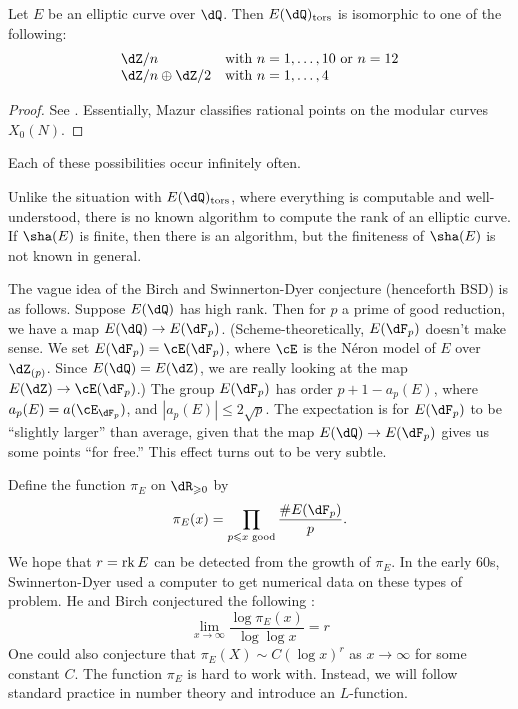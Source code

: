 \documentclass{article}
\begin{document}
\begin{theorem}
Let $E$ be an elliptic curve over $\dQ$. Then $E(\dQ)_\textnormal{tors}$ is 
isomorphic to one of the following:
\[
  \begin{array}{ll}
    \dZ/n & \text{with $n=1,\dots,10$ or $n=12$} \\
    \dZ/n\oplus \dZ/2 & \text{with $n=1,\dots,4$}
  \end{array}
\]
\end{theorem}
\begin{proof}
See \cite[III.5.1]{ma77}. Essentially, Mazur classifies rational points on the 
modular curves $X_0(N)$. 
\end{proof}

Each of these possibilities occur infinitely often.

Unlike the situation with $E(\dQ)_\text{tors}$, where everything is computable 
and well-understood, there is no known algorithm to compute the rank of an 
elliptic curve. If $\sha(E)$ is finite, then there is an algorithm, but the 
finiteness of $\sha(E)$ is not known in general. 

The vague idea of the Birch and Swinnerton-Dyer conjecture (henceforth BSD) is 
as follows. Suppose $E(\dQ)$ has high rank. Then for $p$ a prime of good 
reduction, we have a map $E(\dQ) \to E(\dF_p)$. (Scheme-theoretically, 
$E(\dF_p)$ doesn't make sense. We set $E(\dF_p) = \cE(\dF_p)$, where 
$\cE$ is the N\'eron model of $E$ over $\dZ_{(p)}$. Since 
$E(\dQ) = E(\dZ)$, we are really looking at the map 
$E(\dZ) \to \cE(\dF_p)$.) The group $E(\dF_p)$ has order 
$p+1-a_p(E)$, where $a_p(E) = a(\cE_{\dF_p})$, and 
$|a_p(E)|\leqslant 2\sqrt p$. The expectation is for $E(\dF_p)$ to be 
``slightly larger'' than average, given that the map 
$E(\dQ) \to E(\dF_p)$ gives us some points ``for free.'' This effect turns out 
to be very subtle. 

Define the function $\pi_E$ on $\dR_{\geqslant 0}$ by 
\[
  \pi_E(x) = \prod_{p\leqslant x \text{ good}} \frac{\# E(\dF_p)}{p} \text{.}
\]
We hope that $r=\operatorname{rk} E$ can be detected from the growth of $\pi_E$. In the 
early 60s, Swinnerton-Dyer used a computer to get numerical data on these 
types of problem. He and Birch conjectured the following \cite[A]{bsd65}: 
\[
  \lim_{x\to \infty} \frac{\log \pi_E(x)}{\log \log x} = r
\]
One could also conjecture that $\pi_E(X) \sim C (\log x)^r$ as $x\to \infty$ 
for some constant $C$. The function $\pi_E$ is hard to work with. Instead, we 
will follow standard practice in number theory and introduce an $L$-function. 
\end{document}
